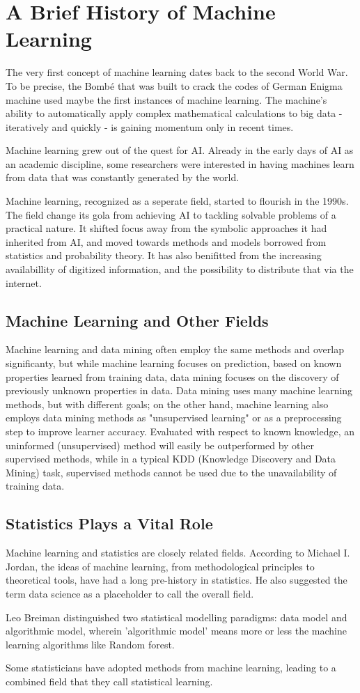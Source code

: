 \chapter{A Brief History of Machine Learning}
The very first concept of machine learning dates back to the second World War. To be precise, the Bomb\'e that was built to crack the codes of German Enigma machine used maybe the first instances of machine learning. The machine's ability to automatically apply complex mathematical calculations to big data - iteratively and quickly - is gaining momentum only in recent times.

Machine learning grew out of the quest for AI. Already in the early days of AI as an academic discipline, some researchers were interested in having machines learn from data that was constantly generated by the world. 

Machine learning, recognized as a seperate field, started to flourish in the 1990s. The field change its gola from achieving AI to tackling solvable problems of a practical nature. It shifted focus away from the symbolic approaches it had inherited from AI, and moved towards methods and models borrowed from statistics and probability theory. It has also benifitted from the increasing availabillity of digitized information, and the possibility to distribute that via the internet.
\section{Machine Learning and Other Fields}
Machine learning and data mining often employ the same methods and overlap significanty, but while machine learning focuses on prediction, based on known properties learned from training data, data mining focuses on the discovery of previously unknown properties in data. Data mining uses many machine learning methods, but with different goals; on the other hand, machine learning also employs data mining methods as "unsupervised learning" or as a preprocessing step to improve learner accuracy. Evaluated with respect to known knowledge, an uninformed (unsupervised) method will easily be outperformed by other supervised methods, while in a typical KDD (Knowledge Discovery and Data Mining) task, supervised methods cannot be used due to the unavailability of training data.
\section{Statistics Plays a Vital Role}
Machine learning and statistics are closely related fields. According to Michael I. Jordan, the ideas of machine learning, from methodological principles to theoretical tools, have had a long pre-history in statistics. He also suggested the term data science as a placeholder to call the overall field.

Leo Breiman distinguished two statistical modelling paradigms: data model and algorithmic model, wherein 'algorithmic model' means more or less the machine learning algorithms like Random forest.

Some statisticians have adopted methods from machine learning, leading to a combined field that they call statistical learning.